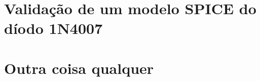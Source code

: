 \documentclass[12pt,a4paper,twoside]{article}
\begin{document}
\section{Validação de um modelo SPICE do díodo 1N4007}

\newpage


\section{Outra coisa qualquer}





\label{fim}
\end{document}
